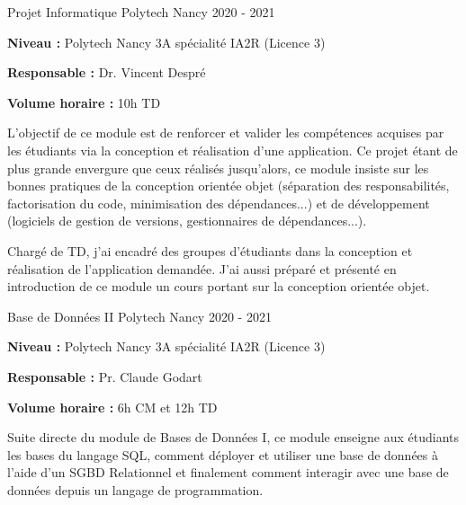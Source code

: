 \documentclass[12pt, a4paper]{awesome-cv}
\begin{document}
\begin{cventries}
  \cventry
  {Projet Informatique}
  {Polytech Nancy}
  {}
  {2020 - 2021}
  {
    \begin{cvitems}
      \item {\textbf{Niveau : } Polytech Nancy 3A spécialité IA2R (Licence 3)}
      \item {\textbf{Responsable : } Dr. Vincent Despré}
      \item {\textbf{Volume horaire : } 10h TD}
    \end{cvitems}
  }

  \begin{cvparagraph}
    L'objectif de ce module est de renforcer et valider les compétences acquises par les étudiants via la conception et réalisation d'une application. Ce projet étant de plus grande envergure que ceux réalisés jusqu'alors, ce module insiste sur les bonnes pratiques de la conception orientée objet (séparation des responsabilités, factorisation du code, minimisation des dépendances...) et de développement (logiciels de gestion de versions, gestionnaires de dépendances...).
  \end{cvparagraph}

  \begin{cvparagraph}
    Chargé de TD, j'ai encadré des groupes d'étudiants dans la conception et réalisation de l'application demandée. J'ai aussi préparé et présenté en introduction de ce module un cours portant sur la conception orientée objet.
  \end{cvparagraph}

  \cventry
  {Base de Données II}
  {Polytech Nancy}
  {}
  {2020 - 2021}
  {
    \begin{cvitems}
      \item {\textbf{Niveau : } Polytech Nancy 3A spécialité IA2R (Licence 3)}
      \item {\textbf{Responsable : } Pr. Claude Godart}
      \item {\textbf{Volume horaire : } 6h CM et 12h TD}
    \end{cvitems}
  }

  \begin{cvparagraph}
    Suite directe du module de Bases de Données I, ce module enseigne aux étudiants les bases du langage SQL, comment déployer et utiliser une base de données à l'aide d'un SGBD Relationnel et finalement comment interagir avec une base de données depuis un langage de programmation.
  \end{cvparagraph}


\end{cventries}
\end{document}

